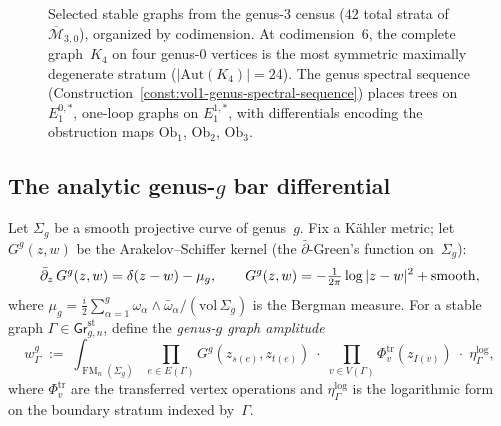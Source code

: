\begin{computation}
\begin{figure}[ht]
\caption{Selected stable graphs from the genus-$3$ census
($42$ total strata of $\overline{\mathcal{M}}_{3,0}$),
organized by codimension.  At codimension~$6$, the
complete graph~$K_4$ on four genus-$0$ vertices is the most
symmetric maximally degenerate stratum
($|\mathrm{Aut}(K_4)| = 24$).
The genus spectral sequence (Construction~\textup{\ref{const:vol1-genus-spectral-sequence}})
places trees on $E_1^{0,*}$, one-loop graphs on $E_1^{1,*}$,
with differentials encoding the obstruction maps
$\mathrm{Ob}_1$, $\mathrm{Ob}_2$, $\mathrm{Ob}_3$.}%
\label{fig:genus3-stable-graph-census}
\end{figure}
\end{computation}

\subsection{The analytic genus-$g$ bar differential}
\label{subsec:renormalized-comparison}

\begin{construction}
\label{constr:genus-g-graph-amplitudes}
Let $\Sigma_g$ be a smooth projective curve of genus~$g$.  Fix a
K\"ahler metric; let $G^g(z,w)$ be the Arakelov--Schiffer kernel
(the $\bar\partial$-Green's function on~$\Sigma_g$):
\[
\bar\partial_z\, G^g(z,w) = \delta(z-w) - \mu_g,
\qquad
G^g(z,w) = -\tfrac{1}{2\pi}\log|z-w|^2
  + \text{\textup{smooth}},
\]
where $\mu_g = \frac{i}{2}\sum_{\alpha=1}^g
\omega_\alpha \wedge \bar\omega_\alpha / (\mathrm{vol}\,\Sigma_g)$
is the Bergman measure.  For a stable graph
$\Gamma \in \mathsf{Gr}^{\mathrm{st}}_{g,n}$, define the
\emph{genus-$g$ graph amplitude}
\begin{equation}\label{eq:genus-g-amplitude}
w_\Gamma^g
\;:=\;
\int_{\operatorname{FM}_n(\Sigma_g)}
\prod_{e \in E(\Gamma)} G^g(z_{s(e)}, z_{t(e)})
\;\cdot\;
\prod_{v \in V(\Gamma)} \Phi_v^{\mathrm{tr}}(z_{I(v)})
\;\cdot\;
\eta_\Gamma^{\log},
\end{equation}
where $\Phi_v^{\mathrm{tr}}$ are the transferred vertex operations
and $\eta_\Gamma^{\log}$ is the logarithmic form on the boundary
stratum indexed by~$\Gamma$.
\end{construction}

